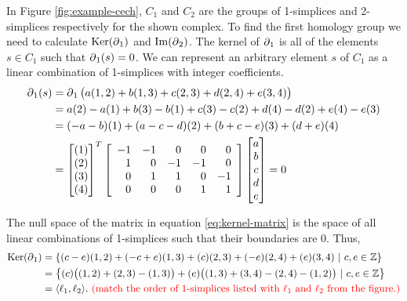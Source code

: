 \begin{example}
    In Figure \ref{fig:example-cech}, \(C_1\) and \(C_2\) are the groups of 1-simplices and 2-simplices respectively for the shown complex.
    To find the first homology group we need to calculate \(\operatorname{Ker}(\operatorname{\partial}_1)\) and \(\operatorname{Im}(\operatorname{\partial}_2)\).
    The kernel of \(\operatorname{\partial}_1\) is all of the elements \(s \in C_1\) such that \(\operatorname{\partial}_1(s) = 0\).
    We can represent an arbitrary element \(s\) of \(C_1\) as a linear combination of 1-simplices with integer coefficients.
    \begin{align}
        \operatorname{\partial}_1(s) &= \operatorname{\partial}_1\big( a(1,2) + b(1,3) + c(2,3) + d(2,4) + e(3,4) \big) \\
        &= a(2) - a(1) + b(3) - b(1) + c(3) - c(2) + d(4) - d(2) + e(4) - e(3)\\
        &= (-a - b)(1) + (a - c - d)(2) + (b + c - e)(3) + (d + e)(4)\\
        &=  \begin{bmatrix}
                (1)\\(2)\\(3)\\(4)\\
            \end{bmatrix}^T
            \left[
            \begin{array}{rrrrr}
                -1 & -1 &  0 &  0 &  0 \\
                 1 &  0 & -1 & -1 &  0 \\
                 0 &  1 &  1 &  0 & -1 \\
                 0 &  0 &  0 &  1 &  1 \\
            \end{array}
            \right]
            \begin{bmatrix}
                a\\b\\c\\d\\e\\
            \end{bmatrix}
        = 0 \label{eq:kernel-matrix}
    \end{align}

    The null space of the matrix in equation \eqref{eq:kernel-matrix} is the space of all linear combinations of 1-simplices such that their boundaries are \(0\). Thus,
    \begin{align}
        \operatorname{Ker}(\operatorname{\partial}_1) &= \{ (c - e)(1,2) + (-c + e)(1,3) + (c)(2,3) + (-e)(2,4) + (e)(3,4)\ |\ c,e \in \mathbb{Z} \}\\
            &= \left\{ (c)\big( (1,2) + (2,3) - (1,3)\big) + (e)\big((1,3) + (3,4) - (2,4) - (1,2)\big)\ |\ c,e \in \mathbb{Z} \right\}\\
            &= \langle \ell_1, \ell_2 \rangle
        . \text{ {\color{red} (match the order of 1-simplices listed with \(\ell_1\) and \(\ell_2\) from the figure.)}}
    \end{align}


\end{example}
